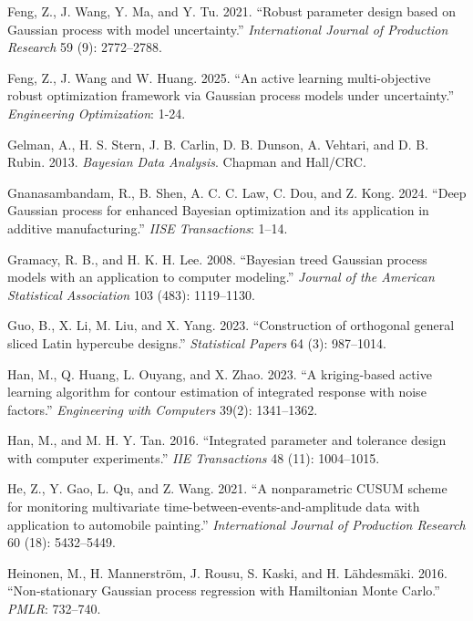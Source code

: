 \documentclass[]{interact}
\theoremstyle{plain}%
\theoremstyle{definition}
\theoremstyle{remark}
\begin{document}
\begin{thebibliography}{}
Feng, Z., J. Wang, Y. Ma, and Y. Tu. 2021. ``Robust parameter design based on Gaussian process with model uncertainty.'' \emph{International Journal of Production Research} 59 (9): 2772--2788.

Feng, Z., J. Wang and W. Huang. 2025. ``An active learning multi-objective robust optimization framework via Gaussian process models under uncertainty.'' \emph{Engineering Optimization}: 1-24.


Gelman, A., H. S. Stern, J. B. Carlin, D. B. Dunson, A. Vehtari, and D. B. Rubin. 2013. \emph{Bayesian Data Analysis}. Chapman and Hall/CRC.

Gnanasambandam, R., B. Shen, A. C. C. Law, C. Dou, and Z. Kong. 2024. ``Deep Gaussian process for enhanced Bayesian optimization and its application in additive manufacturing.'' \emph{IISE Transactions}: 1--14.

Gramacy, R. B., and H. K. H. Lee. 2008. ``Bayesian treed Gaussian process models with an application to computer modeling.'' \emph{Journal of the American Statistical Association} 103 (483): 1119--1130.

Guo, B., X. Li, M. Liu, and X. Yang. 2023. ``Construction of orthogonal general sliced Latin hypercube designs.'' \emph{Statistical Papers} 64 (3): 987--1014.

Han, M., Q. Huang, L. Ouyang, and X. Zhao. 2023. ``A kriging-based active learning algorithm for contour estimation of integrated response with noise factors.'' \emph{Engineering with Computers} 39(2): 1341--1362.

Han, M., and M. H. Y. Tan. 2016. ``Integrated parameter and tolerance design with computer experiments.'' \emph{IIE Transactions} 48 (11): 1004--1015.

He, Z., Y. Gao, L. Qu, and Z. Wang. 2021. ``A nonparametric CUSUM scheme for monitoring multivariate time-between-events-and-amplitude data with application to automobile painting.'' \emph{International Journal of Production Research} 60 (18): 5432--5449.


Heinonen, M., H. Mannerström, J. Rousu, S. Kaski, and H. Lähdesmäki. 2016. ``Non-stationary Gaussian process regression with Hamiltonian Monte Carlo.'' \emph{PMLR}: 732--740.


\end{thebibliography}
\end{document}
